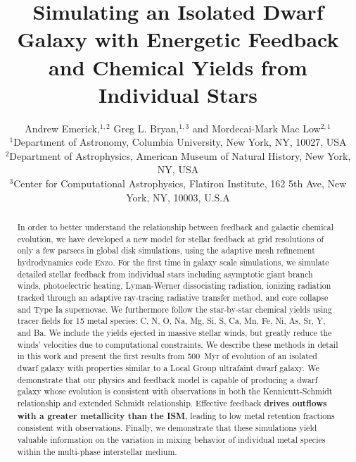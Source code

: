 \documentclass[fleqn,usenatbib,useAMS]{mnras}
\title[Feedback with Individual Stars]{Simulating an Isolated Dwarf Galaxy with Energetic Feedback and Chemical Yields from Individual Stars}
\author[A. Eemerick et. al.]{
Andrew Emerick,$^{1,2}$
Greg L. Bryan,$^{1,3}$
and Mordecai-Mark Mac Low$^{2,1}$
\\
$^{1}$Department of Astronomy, Columbia University, New York, NY, 10027, USA\\
$^{2}$Department of Astrophysics, American Museum of Natural History, New York, NY, USA\\
$^{3}$Center for Computational Astrophysics, Flatiron Institute, 162 5th Ave, New York, NY, 10003, U.S.A}
\begin{document}
\label{firstpage}
\maketitle





\begin{abstract}
In order to better understand the relationship between feedback and galactic chemical evolution, we have developed a new model for stellar feedback at grid resolutions of only a few parsecs in global disk simulations, using the adaptive mesh refinement hydrodynamics code \textsc{Enzo}. For the first time in galaxy scale simulations, we simulate detailed stellar feedback from individual stars including asymptotic giant branch winds, photoelectric heating, Lyman-Werner dissociating radiation, ionizing radiation tracked through an adaptive ray-tracing radiative transfer method, and core collapse and Type Ia supernovae. We furthermore follow the star-by-star chemical yields using tracer fields for 15 metal species: C, N, O, Na, Mg, Si, S, Ca, Mn, Fe, Ni, As, Sr, Y, and Ba. We include the yields ejected in massive stellar winds, but greatly reduce the winds' velocities due to computational constraints. We describe these methods in detail in this work and present the first results from 500~Myr of evolution of an isolated dwarf galaxy with properties similar to a Local Group ultrafaint dwarf galaxy. We demonstrate that our physics and feedback model is capable of producing a dwarf galaxy whose evolution is consistent with observations in both the Kennicutt-Schmidt relationship and extended Schmidt relationship. Effective feedback \textbf{drives outflows with a greater metallicity than the ISM}, leading to low metal retention fractions consistent with observations. Finally, we demonstrate that these simulations yield valuable information on the variation in mixing behavior of individual metal species within the multi-phase interstellar medium.
\end{abstract}
\end{document}
